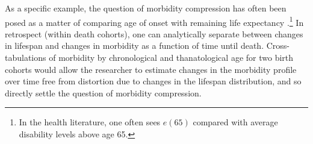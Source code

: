 \documentclass{article}
\begin{document}
As a specific example, the question of morbidity compression has often been
posed as a matter of comparing age of onset with remaining life expectancy
\citep[e.g., ][]{fries2002aging,fries2003measuring}.\footnote{In the health
literature, one often sees $e(65)$ compared with average disability levels above age 65.} In
retrospect (within death cohorts), one can analytically separate between changes
in lifespan and changes in morbidity as a function of time until death. Cross-tabulations of morbidity by chronological and thanatological age for two birth cohorts would allow the
researcher to estimate changes in the morbidity profile over time free from
distortion due to changes in the lifespan distribution, and so directly settle
the question of morbidity compression.


\end{document}
